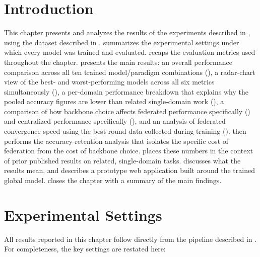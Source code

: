 \section{Introduction}

This chapter presents and analyzes the results of the experiments described in , using the dataset described in .  summarizes the experimental settings under which every model was trained and evaluated.  recaps the evaluation metrics used throughout the chapter.  presents the main results: an overall performance comparison across all ten trained model/paradigm combinations (), a radar-chart view of the best- and worst-performing models across all six metrics simultaneously (), a per-domain performance breakdown that explains why the pooled accuracy figures are lower than related single-domain work (), a comparison of how backbone choice affects federated performance specifically () and centralized performance specifically (), and an analysis of federated convergence speed using the best-round data collected during training ().  then performs the accuracy-retention analysis that isolates the specific cost of federation from the cost of backbone choice.  places these numbers in the context of prior published results on related, single-domain tasks.  discusses what the results mean, and  describes a prototype web application built around the trained global model.  closes the chapter with a summary of the main findings.

\section{Experimental Settings}
\label{sec:exp-settings}

All results reported in this chapter follow directly from the pipeline described in . For completeness, the key settings are restated here:

